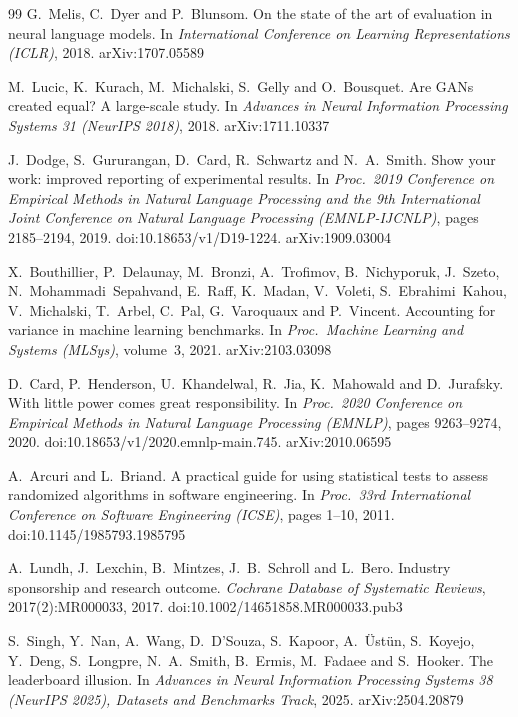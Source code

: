\documentclass[11pt,a4paper]{article}
\begin{document}
\begin{thebibliography}{99}
G.~Melis, C.~Dyer and P.~Blunsom.
\newblock On the state of the art of evaluation in neural language models.
\newblock In \emph{International Conference on Learning Representations
(ICLR)}, 2018.
\newblock arXiv:1707.05589

M.~Lucic, K.~Kurach, M.~Michalski, S.~Gelly and O.~Bousquet.
\newblock Are {GANs} created equal? {A} large-scale study.
\newblock In \emph{Advances in Neural Information Processing Systems 31
(NeurIPS 2018)}, 2018.
\newblock arXiv:1711.10337

J.~Dodge, S.~Gururangan, D.~Card, R.~Schwartz and N.~A.~Smith.
\newblock Show your work: improved reporting of experimental results.
\newblock In \emph{Proc.\ 2019 Conference on Empirical Methods in Natural
Language Processing and the 9th International Joint Conference on Natural
Language Processing (EMNLP-IJCNLP)}, pages 2185--2194, 2019.
\newblock doi:10.18653/v1/D19-1224. arXiv:1909.03004

X.~Bouthillier, P.~Delaunay, M.~Bronzi, A.~Trofimov, B.~Nichyporuk,
J.~Szeto, N.~Mohammadi~Sepahvand, E.~Raff, K.~Madan, V.~Voleti,
S.~Ebrahimi~Kahou, V.~Michalski, T.~Arbel, C.~Pal, G.~Varoquaux and
P.~Vincent.
\newblock Accounting for variance in machine learning benchmarks.
\newblock In \emph{Proc.\ Machine Learning and Systems (MLSys)}, volume~3,
2021.
\newblock arXiv:2103.03098

D.~Card, P.~Henderson, U.~Khandelwal, R.~Jia, K.~Mahowald and D.~Jurafsky.
\newblock With little power comes great responsibility.
\newblock In \emph{Proc.\ 2020 Conference on Empirical Methods in Natural
Language Processing (EMNLP)}, pages 9263--9274, 2020.
\newblock doi:10.18653/v1/2020.emnlp-main.745. arXiv:2010.06595

A.~Arcuri and L.~Briand.
\newblock A practical guide for using statistical tests to assess randomized
algorithms in software engineering.
\newblock In \emph{Proc.\ 33rd International Conference on Software
Engineering (ICSE)}, pages 1--10, 2011.
\newblock doi:10.1145/1985793.1985795

A.~Lundh, J.~Lexchin, B.~Mintzes, J.~B.~Schroll and L.~Bero.
\newblock Industry sponsorship and research outcome.
\newblock \emph{Cochrane Database of Systematic Reviews}, 2017(2):MR000033,
2017.
\newblock doi:10.1002/14651858.MR000033.pub3

S.~Singh, Y.~Nan, A.~Wang, D.~D'Souza, S.~Kapoor, A.~\"Ust\"un, S.~Koyejo,
Y.~Deng, S.~Longpre, N.~A.~Smith, B.~Ermis, M.~Fadaee and S.~Hooker.
\newblock The leaderboard illusion.
\newblock In \emph{Advances in Neural Information Processing Systems 38
(NeurIPS 2025), Datasets and Benchmarks Track}, 2025.
\newblock arXiv:2504.20879


\end{thebibliography}
\end{document}
